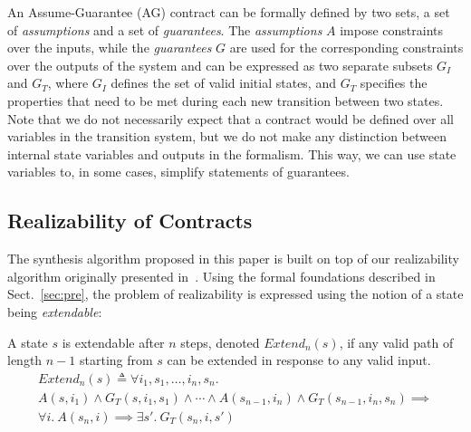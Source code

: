 An Assume-Guarantee (AG) contract can be formally defined by two sets, a set of
\emph{assumptions} and a set of \emph{guarantees}. The \emph{assumptions} $A$
impose constraints over the inputs, while the \emph{guarantees} $G$ are used for
the corresponding constraints over the outputs of the system and can be expressed as
two separate subsets $G_I$ and $G_T$, where $G_I$ defines the set of valid
initial states, and $G_T$ specifies the properties that need to be met during
each new transition between two states. Note that we do not necessarily expect
that a contract would be defined over all variables in the transition system,
but we do not make any distinction between internal state variables and outputs in the formalism.
This way, we can use state variables to, in some cases, simplify statements of guarantees.

\subsection{Realizability of Contracts}
The synthesis algorithm proposed in this paper is built on top of our realizability algorithm
originally presented in~\cite{Katis15:Realizability}. Using the formal foundations described in Sect.~\ref{sec:pre},
the problem of realizability is expressed using the notion of a state being \emph{extendable}:

\begin{definition}
\label{def:extend}
A state $s$ is extendable after $n$ steps, denoted $\mathit{Extend}_{n}(s)$, if
any valid path of length $n-1$ starting from $s$ can be extended in response to
any valid input.%
%
\begin{multline*}%
\mathit{Extend}_{n}(s) \triangleq \forall i_1, s_1, \ldots, i_n, s_n.\\ A(s, i_1) \land G_T(s, i_1, s_1)
\land \cdots \land
A(s_{n-1}, i_n) \land G_T(s_{n-1}, i_n, s_n)
\implies \\
\forall i.~ A(s_n, i) \implies \exists s'.~ G_T(s_n, i, s')
\end{multline*}
\end{definition}

